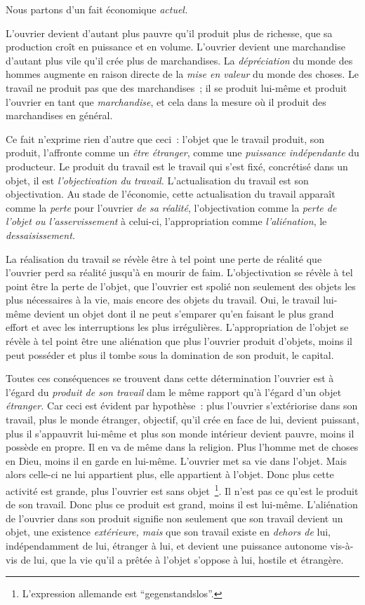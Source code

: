 \documentclass[french,twoside]{book} %
\begin{document}
Nous partons d’un fait économique \emph{actuel.}\par
L’ouvrier devient d’autant plus pauvre qu’il produit plus de richesse, que sa production croît en puissance et en volume. L’ouvrier devient une marchandise d’autant plus vile qu’il crée plus de marchandises. La \emph{dépréciation} du monde des hommes augmente en raison directe de la \emph{mise en valeur} du monde des choses. Le travail ne produit pas que des marchandises ; il se produit lui-même et produit l’ouvrier en tant que \emph{marchandise}, et cela dans la mesure où il produit des marchandises en général.\par
Ce fait n’exprime rien d’autre que ceci : l’objet que le travail produit, son produit, l’affronte comme un \emph{être étranger}, comme une \emph{puissance indépendante} du producteur. Le produit du travail est le travail qui s’est fixé, concrétisé dans un objet, il est \emph{l’objectivation du travail.} L’actualisation du travail est son objectivation. Au stade de l’économie, cette actualisation du travail apparaît comme la \emph{perte} pour l’ouvrier \emph{de sa réalité}, l’objectivation comme la \emph{perte de l’objet ou l’asservissement} à celui-ci, l’appropriation comme \emph{l’aliénation}, le \emph{dessaisissement.}\par
La réalisation du travail se révèle être à tel point une perte de réalité que l’ouvrier perd sa réalité jusqu’à en mourir de faim. L’objectivation se révèle à tel point être la perte de l’objet, que l’ouvrier est spolié non seulement des objets les plus nécessaires à la vie, mais encore des objets du travail. Oui, le travail lui-même devient un objet dont il ne peut s’emparer qu’en faisant le plus grand effort et avec les interruptions les plus irrégulières. L’appropriation de l’objet se révèle à tel point être une aliénation que plus l’ouvrier produit d’objets, moins il peut posséder et plus il tombe sous la domination de son produit, le capital.\par
Toutes ces conséquences se trouvent dans cette détermination l’ouvrier est à l’égard du \emph{produit de son travail} dam le même rapport qu’à l’égard d’un objet \emph{étranger.} Car ceci est évident par hypothèse : plus l’ouvrier s’extériorise dans son travail, plus le monde étranger, objectif, qu’il crée en face de lui, devient puissant, plus il s’appauvrit lui-même et plus son monde intérieur devient pauvre, moins il possède en propre. Il en va de même dans la religion. Plus l’homme met de choses en Dieu, moins il en garde en lui-même. L’ouvrier met sa vie dans l’objet. Mais alors celle-ci ne lui appartient plus, elle appartient à l’objet. Donc plus cette activité est grande, plus l’ouvrier est sans objet \footnote{L’expression allemande est “gegenstandslos”.}. Il n’est pas ce qu’est le produit de son travail. Donc plus ce produit est grand, moins il est lui-même. L’aliénation de l’ouvrier dans son produit signifie non seulement que son travail devient un objet, une existence \emph{extérieure, mais} que son travail existe en \emph{dehors de} lui, indépendamment de lui, étranger à lui, et devient une puissance autonome vis-à-vis de lui, que la vie qu’il a prêtée à l’objet s’oppose à lui, hostile et étrangère.\par
\end{document}
